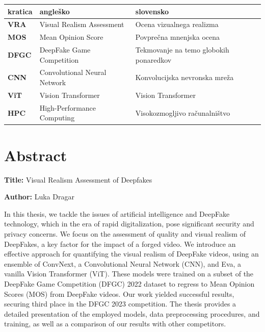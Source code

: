 \documentclass[a4paper,12pt,openright]{book}
\newcommand{\ttitleEn}{Visual Realism Assessment of Deepfakes}
\newcommand{\tauthor}{Luka Dragar}
\newcommand{\clearemptydoublepage}{\newpage{\pagestyle{empty}\cleardoublepage}}
\begin{document}
\noindent\begin{tabular}{p{}|p{}|p{}}
  {\bf kratica} & {\bf angleško}                              & {\bf slovensko} \\ \hline
  {\bf VRA}     & Visual Realism Assessment      & Ocena vizualnega realizma\\
  \hline
  {\bf MOS}     & Mean Opinion Score                           & Povprečna mnenjska ocena \\
  \hline
  {\bf DFGC}    & DeepFake Game Competition                & 
Tekmovanje na temo globokih ponaredkov \\
  \hline
  {\bf CNN}     & Convolutional Neural Network                 & Konvolucijska nevronska mreža \\
  \hline
  {\bf ViT}     & Vision Transformer                           & Vision Transformer \\
  \hline
  {\bf HPC}     & High-Performance Computing                   & Visokozmogljivo računalništvo \\
\end{tabular}



\clearemptydoublepage
{}
\chapter*{Abstract}

\noindent\textbf{Title:} \ttitleEn
\bigskip

\noindent\textbf{Author:} \tauthor
\bigskip

\noindent In this thesis, we tackle the issues of artificial intelligence and DeepFake technology, which in the era of rapid digitalization, pose significant security and privacy concerns. We focus on the assessment of quality and visual realism of DeepFakes, a key factor for the impact of a forged video. We introduce an effective approach for quantifying the visual realism of DeepFake videos, using an ensemble of ConvNext, a Convolutional Neural Network (CNN), and Eva, a vanilla Vision Transformer (ViT). These models were trained on a subset of the DeepFake Game Competition (DFGC) 2022 dataset to regress to Mean Opinion Scores (MOS) from DeepFake videos. Our work yielded successful results, securing third place in the DFGC 2023 competition. The thesis provides a detailed presentation of the employed models, data preprocessing procedures, and training, as well as a comparison of our results with other competitors.
\end{document}
